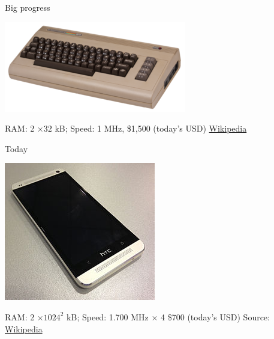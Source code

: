 \documentclass[xcolor=table,compress]{beamer}
\begin{document}
\begin{frame}{Big progress}
\begin{center}
\includegraphics[height=0.7\textheight]{./300px-Commodore-64-Computer}
\end{center}
RAM: 2 $\times 32$ kB; Speed: 1 MHz, \$1,500 (today's USD)
\newline
\href{http://upload.wikimedia.org/wikipedia/commons/thumb/3/34/Commodore-64-Computer.png/300px-Commodore-64-Computer.png}{Wikipedia}
\end{frame}


\begin{frame}{Today}
\begin{center}
\includegraphics[height=0.7\textheight]{./HTC_One_Diagonal_View}
\end{center}
RAM: 2 $ \times 1024 ^2$ kB; Speed: 1.700 MHz $\times$ 4
\newline \$700 (today's USD) \tiny Source: \href{http://upload.wikimedia.org/wikipedia/commons/thumb/3/3d/HTC_One_Diagonal_View.jpg/250px-HTC_One_Diagonal_View.jpg}{Wikipedia}
\end{frame}
\end{document}
